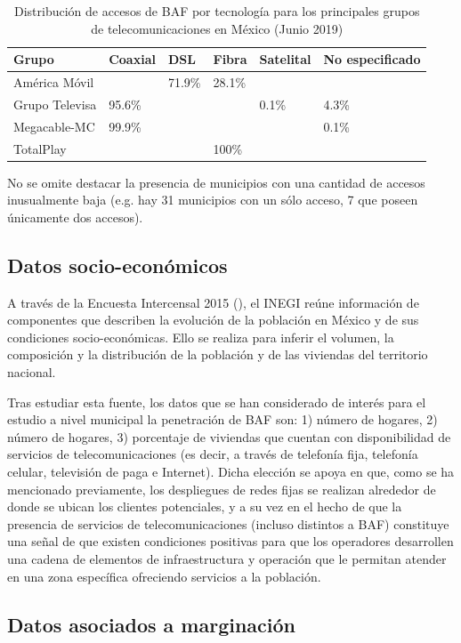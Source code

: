 \documentclass[9pt,twocolumn,twoside]{ilcss}
\begin{document}
\begin{table}[tbhp]
	\centering
	\caption{Distribución de accesos de BAF por tecnología para los principales grupos de telecomunicaciones en México (Junio 2019) \label{table:distribaccesosgrupos}}
\begin{tabular}{@{}llllll@{}}
	\toprule
	Grupo & Coaxial & DSL & Fibra & Satelital & No especificado \\ \midrule
	América Móvil &  & 71.9\% & 28.1\% &  &  \\ 
	Grupo Televisa & 95.6\% &  &  & 0.1\% & 4.3\% \\ 
	Megacable-MC & 99.9\% &  &  &  & 0.1\% \\ 
	TotalPlay &  &  & 100\% &  &  \\ \bottomrule
\end{tabular}
\end{table}
No se omite destacar la presencia de municipios con una cantidad de accesos inusualmente baja (e.g. hay 31 municipios con un sólo acceso, 7 que poseen únicamente dos accesos).

\subsection{Datos socio-económicos}
A través de la Encuesta Intercensal 2015 (\cite{Intercensal2015}), el INEGI reúne información de componentes que describen la evolución de la población en México y de sus condiciones socio-económicas. Ello se realiza para inferir el volumen, la composición y la distribución de la población y de las viviendas del territorio nacional.

Tras estudiar esta fuente, los datos que se han considerado de interés para el estudio a nivel municipal la penetración de BAF son: 1) número de hogares, 2) número de hogares, 3) porcentaje de viviendas que cuentan con disponibilidad de servicios de telecomunicaciones (es decir, a través de telefonía fija, telefonía celular, televisión de paga e Internet). Dicha elección se apoya en que, como se ha mencionado previamente, los despliegues de redes fijas se realizan alrededor de donde se ubican los clientes potenciales, y a su vez en el hecho de que la presencia de servicios de telecomunicaciones (incluso distintos a BAF) constituye una señal de que existen condiciones positivas para que los operadores desarrollen una cadena de elementos de infraestructura y operación que le permitan atender en una zona específica ofreciendo servicios a la población.


\subsection{Datos asociados a marginación}
\end{document}
